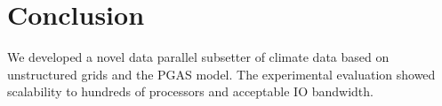 \section{Conclusion}
\label{section:conclusion}

We developed a novel data parallel subsetter of climate data based on
unstructured grids and the PGAS model.  The experimental evaluation showed
scalability to hundreds of processors and acceptable IO bandwidth.
